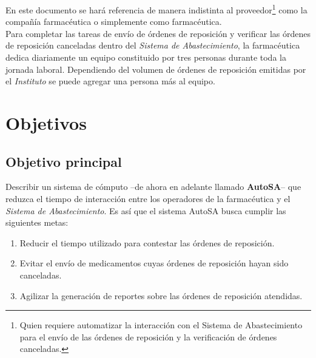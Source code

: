 En este documento se hará referencia de manera indistinta al proveedor\footnote{Quien requiere automatizar la interacción con el Sistema de Abastecimiento para el envío de las órdenes de reposición y la verificación de órdenes canceladas.} como la compañía farmacéutica o simplemente como farmacéutica.\\
Para completar las tareas de envío de órdenes de reposición y verificar las órdenes de reposición canceladas dentro del \textit{Sistema de Abastecimiento}, la farmacéutica dedica diariamente un equipo constituido por tres personas durante toda la jornada laboral. Dependiendo del volumen de órdenes de reposición emitidas por el \textit{Instituto} se puede agregar una persona más al equipo.
\section{Objetivos}
\subsection{Objetivo principal}\label{sec:objetivo-principal}
Describir un sistema de cómputo --de ahora en adelante llamado \textbf{AutoSA}-- que reduzca el tiempo de interacción entre los operadores de la farmacéutica y el \textit{Sistema de Abastecimiento}. Es así que el sistema AutoSA busca cumplir las siguientes metas:
\begin{enumerate}
	\item Reducir el tiempo utilizado para contestar las órdenes de reposición.
	\item Evitar el envío de medicamentos cuyas órdenes de reposición hayan sido canceladas.
	\item Agilizar la generación de reportes sobre las órdenes de reposición atendidas.
\end{enumerate}
